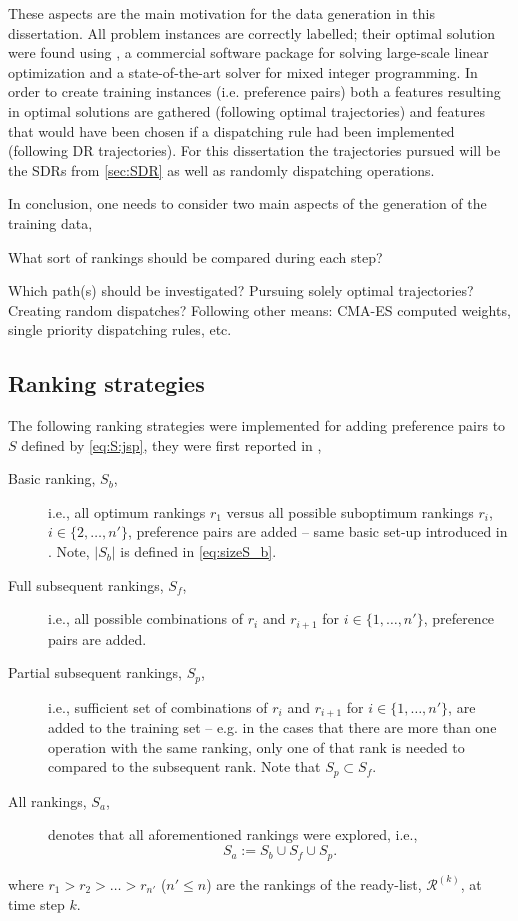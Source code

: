 These aspects are the main motivation for the data generation in this dissertation. All problem instances are correctly labelled; their optimal solution were found using \cite{gurobi}, a commercial software package for solving large-scale linear optimization and a state-of-the-art solver for mixed integer programming. In order to create training instances (i.e. preference pairs) both a features resulting in optimal solutions are gathered (following optimal trajectories) and features that would have been chosen if a dispatching rule had been implemented (following DR trajectories). 
For this dissertation the trajectories pursued will be the SDRs from \cref{sec:SDR} as well as randomly dispatching operations.

In conclusion, one needs to consider two main aspects of the generation of the training data, 
\begin{inparaenum}[(a)]
\item What sort of rankings should be compared during each step? 
\item Which path(s) should be investigated? Pursuing solely optimal trajectories? Creating random dispatches? Following other means: CMA-ES computed weights, single priority dispatching rules, etc. 
\end{inparaenum}

\subsection{Ranking strategies}
The following ranking strategies were implemented for adding preference pairs to $S$ defined by \cref{eq:S:jsp}, they were first reported in \citet{InRu14b},
\begin{description}
\item[Basic ranking, $S_b$,] i.e., all optimum rankings $r_1$ versus all possible suboptimum rankings $r_i$, $i\in\{2,\ldots,n'\}$, preference pairs are added -- same basic set-up introduced in \cite{InRu11a}. Note, $|S_b|$ is defined in \cref{eq:sizeS_b}.
\item[Full subsequent rankings, $S_f$,] i.e., all possible combinations of $r_i$ and $r_{i+1}$ for $i\in\{1,\ldots,n'\}$, preference pairs are added.
\item[Partial subsequent rankings, $S_p$,] i.e., sufficient set of combinations of $r_i$ and $r_{i+1}$ for $i\in\{1,\ldots,n'\}$, are added to the training set -- e.g. in the cases that there are more than one operation with the same ranking, only one of that rank is needed to compared to the subsequent rank. Note that $S_p\subset S_f$.
\item[All rankings, $S_a$,] denotes that all aforementioned rankings were explored, i.e., 
\begin{equation}S_{a}:=S_b\cup S_f\cup S_p.\end{equation}
\end{description}
where $r_1>r_2>\ldots>r_{n'}$ ($n'\leq n$) are the rankings of the ready-list, $\mathcal{R}^{(k)}$, at time step $k$.


